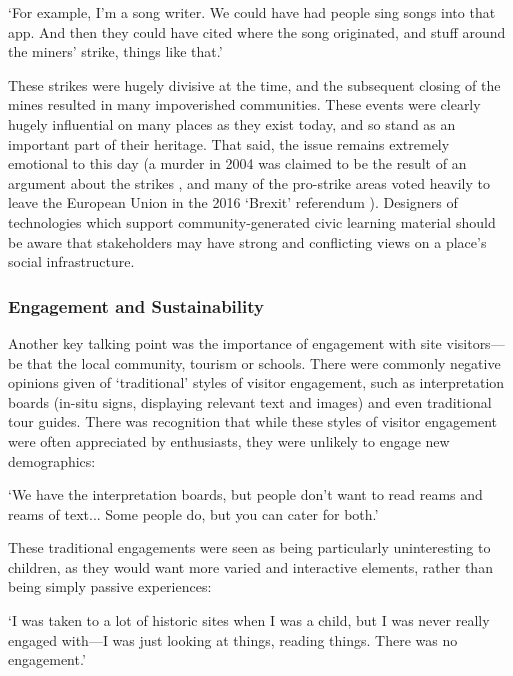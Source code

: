 \begin{displayquote}
`For example, I'm a song writer. We could have had people sing songs into that app. And then they could have cited where the song originated, and stuff around the miners' strike, things like that.'
\end{displayquote}

These strikes were hugely divisive at the time, and the subsequent closing of the mines resulted in many impoverished communities. These events were clearly hugely influential on many places as they exist today, and so stand as an important part of their heritage. That said, the issue remains extremely emotional to this day (a murder in 2004 was claimed to be the result of an argument about the strikes \citep{theindependent_2004}, and many of the pro-strike areas voted heavily to leave the European Union in the 2016 `Brexit' referendum \citep{dailypost_2017}). Designers of technologies which support community-generated civic learning material should be aware that stakeholders may have strong and conflicting views on a place's social infrastructure. 

\subsubsection{Engagement and Sustainability}

Another key talking point was the importance of engagement with site visitors---be that the local community, tourism or schools. There were commonly negative opinions given of `traditional' styles of visitor engagement, such as interpretation boards (in-situ signs, displaying relevant text and images) and even traditional tour guides. There was recognition that while these styles of visitor engagement were often appreciated by enthusiasts, they were unlikely to engage new demographics:

\begin{displayquote}
`We have the interpretation boards, but people don't want to read reams and reams of text... Some people do, but you can cater for both.'
\end{displayquote}

These traditional engagements were seen as being particularly uninteresting to children, as they would want more varied and interactive elements, rather than being simply passive experiences:

\begin{displayquote}
`I was taken to a lot of historic sites when I was a child, but I was never really engaged with---I was just looking at things, reading things. There was no engagement.'
\end{displayquote}

